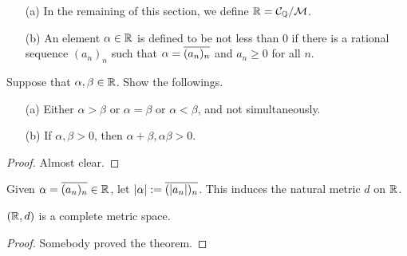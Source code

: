 \begin{defi}
    \begin{enumerate}
        \item[(a)]
        {
            In the remaining of this section, we define ${\mathbb{R}}={\mathcal{C}}_{\mathbb{Q}}/{\mathcal{M}}$.
        }
        \item[(b)]
        {
            An element $\alpha\in{\mathbb{R}}$ is defined to be not less than 0 if there is a rational sequence $(a_n)_n$ such that $\alpha=\overline{(a_n)_n}$ and $a_n\geq 0$ for all $n$.
        }
    \end{enumerate}
\end{defi}
\begin{prop}
    Suppose that $\alpha, \beta\in{\mathbb{R}}$.
    Show the followings.
    \begin{enumerate}
        \item[(a)]
        {
            Either $\alpha>\beta$ or $\alpha=\beta$ or $\alpha<\beta$, and not simultaneously.
        }
        \item[(b)]
        {
            If $\alpha, \beta>0$, then $\alpha+\beta, \alpha\beta>0$.
        }
    \end{enumerate}
\end{prop}
\begin{proof}
    Almost clear.
\end{proof}

Given $\alpha=\overline{(a_n)_n}\in{\mathbb{R}}$, let $|\alpha|:=\overline{(|a_n|)_n}$.
This induces the natural metric $d$ on ${\mathbb{R}}$.
\begin{thm}
    $({\mathbb{R}}, d)$ is a complete metric space.
\end{thm}
\begin{proof}
    Somebody proved the theorem.
\end{proof}